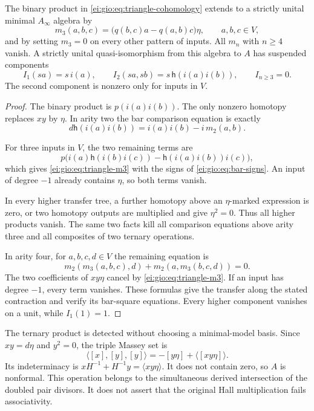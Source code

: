 \begin{theorem}\label{ei:gio:thm:triangle-minimal}
The binary product in \eqref{ei:gio:eq:triangle-cohomology}
extends to a strictly unital minimal $A_\infty$ algebra by
\begin{equation}\label{ei:gio:eq:triangle-m3}
 m_3(a,b,c)=\bigl(q(b,c)a-q(a,b)c\bigr)\eta,
 \qquad a,b,c\in V,
\end{equation}
and by setting $m_3=0$ on every other pattern of inputs.
All $m_n$ with $n\ge4$ vanish. A strictly unital
quasi-isomorphism from this algebra to $A$ has suspended
components
\[
 I_1(sa)=s\,i(a),\qquad
 I_2(sa,sb)=s\,\mathsf h(i(a)i(b)),\qquad I_{n\ge3}=0.
\]
The second component is nonzero only for inputs in $V$.
\end{theorem}

\begin{proof}
The binary product is $p(i(a)i(b))$.
The only nonzero homotopy replaces $xy$ by $\eta$.
In arity two the bar comparison equation is exactly
\[
 d\mathsf h(i(a)i(b))=i(a)i(b)-i\,m_2(a,b).
\]

For three inputs in $V$, the two remaining terms are
\[
 p\bigl(i(a)\mathsf h(i(b)i(c))-\mathsf h(i(a)i(b))i(c)\bigr),
\]
which gives \eqref{ei:gio:eq:triangle-m3} with the signs
of \eqref{ei:gio:eq:bar-signs}. An input of degree $-1$ already
contains $\eta$, so both terms vanish.

In every higher transfer tree, a further homotopy above
an $\eta$-marked expression is zero, or two homotopy
outputs are multiplied and give $\eta^2=0$.
Thus all higher products vanish. The same two facts
kill all comparison equations above arity three and
all composites of two ternary operations.

In arity four,
for $a,b,c,d\in V$ the remaining equation is
\[
 m_2(m_3(a,b,c),d)+m_2(a,m_3(b,c,d))=0.
\]
The two coefficients of $xy\eta$ cancel by
\eqref{ei:gio:eq:triangle-m3}. If an input has degree
$-1$, every term vanishes. These formulas give the
transfer along the stated contraction and verify
its bar-square equations. Every higher component
vanishes on a unit, while $I_1(1)=1$.
\end{proof}

The ternary product is detected without choosing a
minimal-model basis. Since $xy=d\eta$ and $y^2=0$,
the triple Massey set is
\begin{equation}\label{ei:gio:eq:triangle-massey}
 \langle[x],[y],[y]\rangle
 =-[y\eta]+\langle[xy\eta]\rangle.
\end{equation}
Its indeterminacy is
$xH^{-1}+H^{-1}y=\langle xy\eta\rangle$.
It does not contain zero, so $A$ is nonformal.
This operation belongs to the simultaneous derived
intersection of the doubled pair divisors. It does not
assert that the original Hall multiplication fails
associativity.

